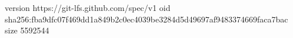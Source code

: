 version https://git-lfs.github.com/spec/v1
oid sha256:fba9dfc07f469dd1a849b2c0ec4039be3284d5d49697af9483374669faca7bac
size 5592544
